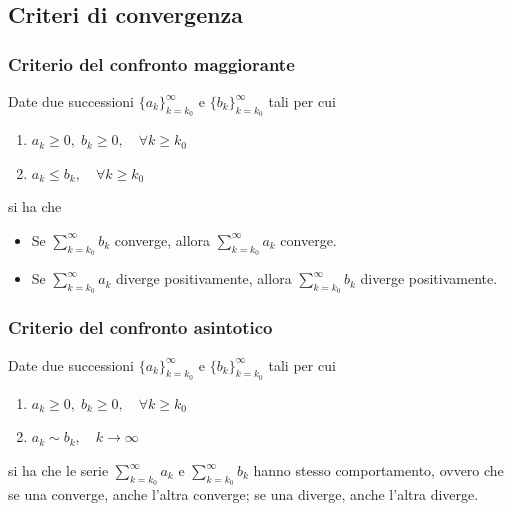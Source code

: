         \subsection{Criteri di convergenza}
            \subsubsection{Criterio del confronto maggiorante}
                Date due successioni $\{a_{k}\}_{k = k_{0}}^{\infty}$ e $\{b_{k}\}_{k = k_{0}}^{\infty}$ tali per cui
                \begin{enumerate}[label=(\arabic*)]
                    \item $a_{k} \geq 0, \; b_{k} \geq 0, \quad \forall k \geq k_{0}$
                    \item $a_{k} \leq b_{k}, \quad \forall k \geq k_{0}$
                \end{enumerate}
                si ha che
                \begin{itemize}
                    \item Se $\sum_{k = k_{0}}^{\infty} b_{k}$ converge, allora $\sum_{k = k_{0}}^{\infty} a_{k}$ converge.
                    \item Se $\sum_{k = k_{0}}^{\infty} a_{k}$ diverge positivamente, allora $\sum_{k = k_{0}}^{\infty} b_{k}$ diverge positivamente.
                \end{itemize}

            \subsubsection{Criterio del confronto asintotico}
                Date due successioni $\{a_{k}\}_{k = k_{0}}^{\infty}$ e $\{b_{k}\}_{k = k_{0}}^{\infty}$ tali per cui
                \begin{enumerate}[label=(\arabic*)]
                    \item $a_{k} \geq 0, \; b_{k} \geq 0, \quad \forall k \geq k_{0}$
                    \item $a_{k} \sim b_{k}, \quad k \rightarrow \infty$
                \end{enumerate}
                si ha che le serie $\sum_{k = k_{0}}^{\infty} a_{k}$ e $\sum_{k = k_{0}}^{\infty} b_{k}$ hanno stesso comportamento, ovvero che se una converge, anche l'altra converge; se una diverge, anche l'altra diverge.

